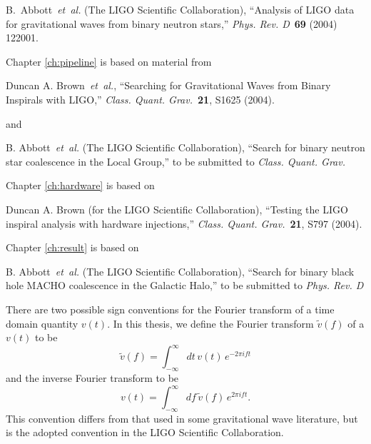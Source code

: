 \documentclass[12pt,notitlepage]{report}
\newcommand{\cqg}{{\it Class. Quant. Grav.}}
\newcommand{\prd}{{\it Phys. Rev. D}}
\begin{document}
\vspace*{0.25cm}

\noindent B.~Abbott~{\it et~al.} (The LIGO Scientific Collaboration),
``Analysis of LIGO data for gravitational waves from binary neutron stars,''
\prd~{\bf 69} (2004) 122001.

\vspace*{0.5cm}

\noindent Chapter \ref{ch:pipeline} is based on material from

\vspace*{0.25cm}

\noindent Duncan A. Brown~{\it et~al.}, ``Searching for Gravitational Waves
from Binary Inspirals with LIGO,'' \cqg~{\bf 21}, S1625 (2004).

\vspace*{0.25cm}

\noindent and

\vspace*{0.25cm}

\noindent B. Abbott~{\it et~al.} (The LIGO Scientific Collaboration), ``Search
for binary neutron star coalescence in the Local Group,'' to be submitted to
\cqg

\vspace*{0.5cm}

\noindent Chapter \ref{ch:hardware} is based on 

\vspace*{0.25cm}

\noindent Duncan A. Brown (for the LIGO Scientific Collaboration), ``Testing
the LIGO inspiral analysis with hardware injections,'' \cqg~{\bf 21}, S797
(2004).

\vspace*{0.5cm}

\noindent Chapter \ref{ch:result} is based on

\vspace*{0.25cm}

\noindent B. Abbott~{\it et~al.} (The LIGO Scientific Collaboration), ``Search
for binary black hole MACHO coalescence in the Galactic Halo,'' to be
submitted to \prd




There are two possible sign conventions for the Fourier transform of a time
domain quantity $v(t)$. In this thesis, we define the Fourier transform
$\tilde{v}(f)$ of a $v(t)$ to be
\begin{equation*}
\tilde{v}(f)=\int_{-\infty}^\infty dt\,v(t)\, e^{- 2 \pi i f t}
\end{equation*}
and the inverse Fourier transform to be 
\begin{equation*}
v(t)=\int_{-\infty}^\infty df\,\tilde{v}(f)\, e^{2 \pi i f t}.
\end{equation*}
This convention differs from that used in some gravitational wave literature,
but is the adopted convention in the LIGO Scientific Collaboration.
\end{document}
